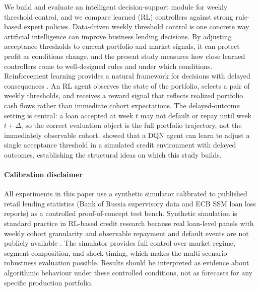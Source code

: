 \documentclass[preprint,review,authoryear,12pt]{elsarticle}
\begin{document}
We build and evaluate an intelligent decision-support module for weekly threshold
control, and we compare learned (RL) controllers against strong rule-based expert
policies. Data-driven weekly threshold control is one concrete way artificial
intelligence can improve business lending decisions. By adjusting acceptance
thresholds to current portfolio and market signals, it can protect profit as conditions
change, and the present study measures how close learned controllers come to
well-designed rules and under which conditions. Reinforcement learning provides a natural framework for
decisions with delayed consequences \citep{arulkumaran2017}. An RL agent observes the
state of the portfolio, selects a pair of weekly thresholds, and receives a reward
signal that reflects realized portfolio cash flows rather than immediate cohort
expectations. The delayed-outcome setting is central: a loan accepted at week $t$ may
not default or repay until week $t + \Delta$, so the correct evaluation object is the
full portfolio trajectory, not the immediately observable cohort.
\citet{herasymovych2019} showed that a DQN agent can learn to adjust a single
acceptance threshold in a simulated credit environment with delayed outcomes,
establishing the structural ideas on which this study builds.

\paragraph{Calibration disclaimer}
All experiments in this paper use a synthetic simulator calibrated to published retail
lending statistics (Bank of Russia supervisory data and ECB SSM loan loss reports) as
a controlled proof-of-concept test bench. Synthetic simulation is standard practice in
RL-based credit research because real loan-level panels with weekly cohort granularity
and observable repayment and default events are not publicly available
\citep{herasymovych2019, lessmann2015}. The simulator provides full control over market
regime, segment composition, and shock timing, which makes the multi-scenario
robustness evaluation possible. Results should be interpreted as evidence about
algorithmic behaviour under these controlled conditions, not as forecasts for any
specific production portfolio.
\end{document}
